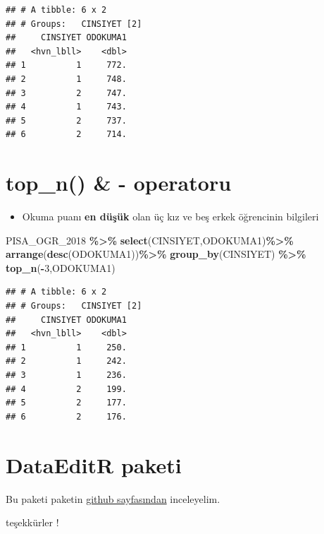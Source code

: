 \documentclass[
  oneside]{book}
\newenvironment{Shaded}{\begin{snugshade}}{\end{snugshade}}
\newcommand{\DecValTok}[1]{\textcolor[rgb]{0.00,0.00,0.81}{#1}}
\newcommand{\FunctionTok}[1]{\textcolor[rgb]{0.13,0.29,0.53}{\textbf{#1}}}
\newcommand{\NormalTok}[1]{#1}
\newcommand{\SpecialCharTok}[1]{\textcolor[rgb]{0.81,0.36,0.00}{\textbf{#1}}}
\providecommand{\tightlist}{%
  \setlength{\itemsep}{0pt}\setlength{\parskip}{0pt}}
\begin{document}
\begin{verbatim}
## # A tibble: 6 x 2
## # Groups:   CINSIYET [2]
##     CINSIYET ODOKUMA1
##   <hvn_lbll>    <dbl>
## 1          1     772.
## 2          1     748.
## 3          2     747.
## 4          1     743.
## 5          2     737.
## 6          2     714.
\end{verbatim}

\hypertarget{top_n---operatoru}{%
\section{top\_n() \& - operatoru}\label{top_n---operatoru}}

\begin{itemize}
\tightlist
\item
  Okuma puanı \textbf{en düşük} olan üç kız ve beş erkek öğrencinin bilgileri
\end{itemize}

\begin{Shaded}
\begin{Highlighting}[]
\NormalTok{PISA\_OGR\_2018 }\SpecialCharTok{\%\textgreater{}\%}
  \FunctionTok{select}\NormalTok{(CINSIYET,ODOKUMA1)}\SpecialCharTok{\%\textgreater{}\%} 
  \FunctionTok{arrange}\NormalTok{(}\FunctionTok{desc}\NormalTok{(ODOKUMA1))}\SpecialCharTok{\%\textgreater{}\%} 
  \FunctionTok{group\_by}\NormalTok{(CINSIYET) }\SpecialCharTok{\%\textgreater{}\%} 
  \FunctionTok{top\_n}\NormalTok{(}\SpecialCharTok{{-}}\DecValTok{3}\NormalTok{,ODOKUMA1)}
\end{Highlighting}
\end{Shaded}

\begin{verbatim}
## # A tibble: 6 x 2
## # Groups:   CINSIYET [2]
##     CINSIYET ODOKUMA1
##   <hvn_lbll>    <dbl>
## 1          1     250.
## 2          1     242.
## 3          1     236.
## 4          2     199.
## 5          2     177.
## 6          2     176.
\end{verbatim}

\hypertarget{dataeditr-paketi}{%
\section{DataEditR paketi}\label{dataeditr-paketi}}

Bu paketi paketin \href{https://github.com/DillonHammill/DataEditR}{github sayfasından} inceleyelim.

teşekkürler !

🍵
\end{document}
